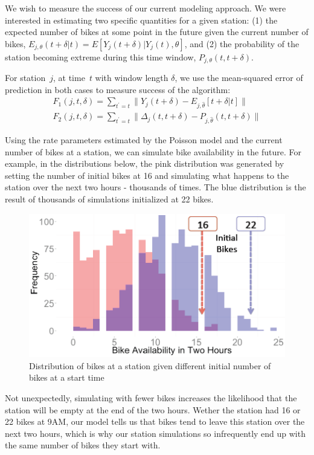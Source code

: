 \documentclass{acm_proc_article-sp}
\begin{document}
We wish to measure the success of our current modeling approach.  We were interested in estimating two specific quantities for a given station: (1) the expected number of bikes at some point in the future given the current number of bikes, $E_{j, \theta} (t+\delta | t) = E[ Y_j(t+\delta) | Y_j(t), \theta]$, and (2) the probability of the station becoming extreme during this time window, $P_{j,\theta} (t, t+\delta)$.

For station~$j$, at time~$t$ with window length $\delta$, we use the mean-squared error of prediction in both cases to measure success of the algorithm:
\begin{align}
F_1(j, t, \delta) = \sum_{t^\prime = t} \| Y_j(t + \delta) - E_{j,\hat{\theta}} [ t+\delta | t] \| \\
F_2(j, t, \delta) = \sum_{t^\prime = t} \| \Delta_j(t,t + \delta) - P_{j,\hat{\theta}} ( t, t+\delta) \|
\end{align}

\vspace{0.25cm}
Using the rate parameters estimated by the Poisson model and the current number of bikes at a station, we can simulate bike availability in the future. For example, in the distributions below, the pink distribution was generated by setting the number of initial bikes at 16 and simulating what happens to the station over the next two hours - thousands of times. The blue distribution is the result of thousands of simulations initialized at 22 bikes.

\begin{figure} [!h]
\caption{Distribution of bikes at a station given different initial number of bikes at a start time}
\centering
\includegraphics[scale = 0.5]{poisson_simulated_number_of_bikes.png}
\end{figure}
Not unexpectedly, simulating with fewer bikes increases the likelihood that the station will be empty at the end of the two hours. Wether the station had 16 or 22 bikes at 9AM, our model tells us that bikes tend to leave this station over the next two hours, which is why our station simulations so infrequently end up with the same number of bikes they start with.
\end{document}
